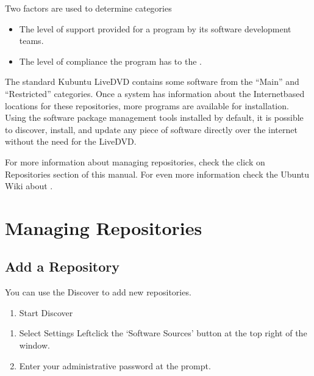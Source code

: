 \documentclass[letterpaper,10pt,english]{sphinxmanual}
\begin{document}
\sphinxAtStartPar
Two factors are used to determine categories
\begin{itemize}
\item {} 
\sphinxAtStartPar
The level of support provided for a program by its software development teams.

\item {} 
\sphinxAtStartPar
The level of compliance the program has to the .

\end{itemize}

\sphinxAtStartPar
The standard Kubuntu LiveDVD contains some software from the “Main” and “Restricted” categories. Once a system has information about the Internet\sphinxhyphen{}based locations for these repositories, more programs are available for installation. Using the software package management tools installed by default, it is possible to discover, install, and update any piece of software directly over the internet without the need for the LiveDVD.

\sphinxAtStartPar
For more information about managing repositories, check the click on Repositories section of this manual. For even more information check the Ubuntu Wiki about .


\section{Managing Repositories}
\label{\detokenize{docs/repositories:id1}}

\subsection{Add a Repository}
\label{\detokenize{docs/repositories:add-a-repository}}
\sphinxAtStartPar
You can use the Discover to add new repositories.
\begin{enumerate}
%
\item {} 
\sphinxAtStartPar
Start Discover

\end{enumerate}

\begin{enumerate}
%
\setcounter{enumi}{1}
\item {} 
\sphinxAtStartPar
Select Settings Left\sphinxhyphen{}click the ‘Software Sources’ button at the top right of the window.

\item {} 
\sphinxAtStartPar
Enter your administrative password at the prompt.

\end{enumerate}
\end{document}
